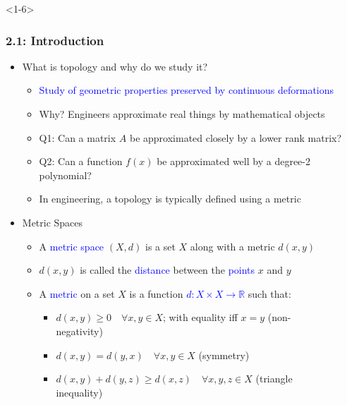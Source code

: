 \documentclass[10pt,english,aspectratio=169,handout]{beamer}
\begin{document}
\begin{frame}<1-6> \frametitle{2.1: Introduction}

\begin{itemize}
\setlength\itemsep{3mm}
\item<1-> What is topology and why do we study it? \vspace{1mm}
\begin{itemize} 
  \setlength\itemsep{1.5mm}
  \item<1-> \textcolor{blue}{Study of geometric properties preserved by continuous deformations}
  \item<2-> Why? Engineers approximate real things by mathematical objects
  \item<2-> Q1: Can a matrix $A$ be approximated closely by a lower rank matrix?
  \item<2-> Q2: Can a function $f(x)$ be approximated well by a degree-2 polynomial?
  \item<3-> In engineering, a topology is typically defined using a metric
\end{itemize}

\vspace{1mm}

\item<4-> Metric Spaces \vspace{1mm}
\begin{itemize} 
  \setlength\itemsep{1.5mm}
  \item<4-> A \textcolor{blue}{metric space} $(X,d)$ is a set $X$ along with a metric $d(x,y)\!\!$
  \item<4-> $d(x,y)$ is called the \textcolor{blue}{distance} between the \textcolor{blue}{points} $x$ and $y$
  \item<5-> A \textcolor{blue}{metric} on a set $X$ is a function \textcolor{blue}{$d \colon X \times X \rightarrow \mathbb{R} $} such that: \vspace{1mm}
  \begin{itemize}
  \setlength\itemsep{1.5mm}
  \item<5->[1.] $d(x,y) \geq 0 \quad \forall x, y \in X$; with equality iff $x = y$ \hfill (non-negativity)~~~~~~~~~
  \item<5->[2.] $d(x,y) = d(y,x) \quad \forall x, y \in X$ \hfill (symmetry)~~~~~~~~~
  \item<6->[3.] $d(x,y) + d(y,z) \geq d(x,z) \quad \forall x, y, z \in X$ \hfill (triangle inequality)~~~~~~~~~
  \end{itemize}
\end{itemize}
\end{itemize}


\end{frame}
\end{document}
